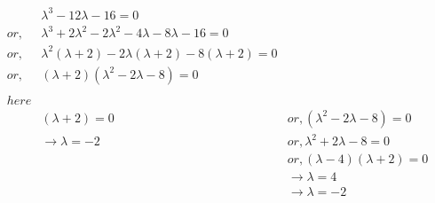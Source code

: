 \documentclass{article}
\begin{document}
\begin{align*}
    &\lambda^3 - 12\lambda - 16 = 0 \\
    or, &\lambda^3 + 2\lambda^2 - 2\lambda^2 -4\lambda - 8\lambda -16 = 0 \\
    or, &\lambda^2(\lambda+2) - 2\lambda(\lambda+2) - 8(\lambda+2) = 0\\
    or, &(\lambda+2)(\lambda^2 -2\lambda -8) = 0\\
    \\
    here \\
    &(\lambda+2) = 0 &or,(\lambda^2 -2\lambda -8) = 0\\
    &\rightarrow\lambda = -2 &or,\lambda^2 + 2\lambda - 8 = 0\\
    &&or,(\lambda-4)(\lambda+2)=0\\
    &&\rightarrow\lambda = 4 \\ &&\rightarrow \lambda = -2
\end{align*}

\newpage
\end{document}
